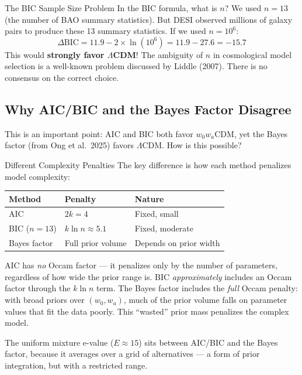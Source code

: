 \documentclass[11pt,a4paper]{article}
\newcommand{\LCDM}{$\Lambda$CDM}
\begin{document}
\begin{warningbox}{The BIC Sample Size Problem}
In the BIC formula, what is $n$? We used $n = 13$ (the number of BAO summary statistics). But DESI observed millions of galaxy pairs to produce these 13 summary statistics. If we used $n = 10^6$:
$$\Delta\text{BIC} = 11.9 - 2 \times \ln(10^6) = 11.9 - 27.6 = -15.7$$
This would \textbf{strongly favor \LCDM}! The ambiguity of $n$ in cosmological model selection is a well-known problem discussed by Liddle (2007). There is no consensus on the correct choice.
\end{warningbox}

\subsection{Why AIC/BIC and the Bayes Factor Disagree}

This is an important point: AIC and BIC both favor $w_0w_a$CDM, yet the Bayes factor (from Ong et al.\ 2025) favors \LCDM. How is this possible?

\begin{conceptbox}{Different Complexity Penalties}
The key difference is how each method penalizes model complexity:

\begin{center}
\begin{tabular}{lll}
\toprule
\textbf{Method} & \textbf{Penalty} & \textbf{Nature} \\
\midrule
AIC & $2k = 4$ & Fixed, small \\
BIC ($n=13$) & $k\ln n \approx 5.1$ & Fixed, moderate \\
Bayes factor & Full prior volume & Depends on prior width \\
\bottomrule
\end{tabular}
\end{center}

AIC has \textit{no} Occam factor --- it penalizes only by the number of parameters, regardless of how wide the prior range is. BIC \textit{approximately} includes an Occam factor through the $k\ln n$ term. The Bayes factor includes the \textit{full} Occam penalty: with broad priors over $(w_0, w_a)$, much of the prior volume falls on parameter values that fit the data poorly. This ``wasted'' prior mass penalizes the complex model.

The uniform mixture e-value ($E \approx 15$) sits between AIC/BIC and the Bayes factor, because it averages over a grid of alternatives --- a form of prior integration, but with a restricted range.
\end{conceptbox}
\end{document}
